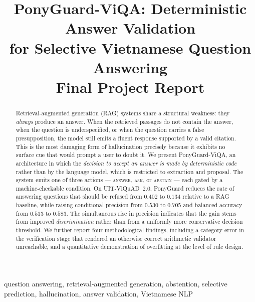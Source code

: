 \documentclass[conference]{IEEEtran}
\newcommand{\ACT}[1]{\textsc{#1}}
\begin{document}
\title{PonyGuard-ViQA: Deterministic Answer Validation\\
for Selective Vietnamese Question Answering\\
\large\textbf{Final Project Report}}

\author{
}

\maketitle

\begin{abstract}
Retrieval-augmented generation (RAG) systems share a structural weakness: they
\emph{always} produce an answer. When the retrieved passages do not contain the
answer, when the question is underspecified, or when the question carries a false
presupposition, the model still emits a fluent response supported by a valid
citation. This is the most damaging form of hallucination precisely because it
exhibits no surface cue that would prompt a user to doubt it. We present
PonyGuard-ViQA, an architecture in which the \emph{decision to accept an answer
is made by deterministic code} rather than by the language model, which is
restricted to extraction and proposal. The system emits one of three actions ---
\ACT{answer}, \ACT{ask}, or \ACT{abstain} --- each gated by a machine-checkable
condition. On UIT-ViQuAD~2.0, PonyGuard reduces the rate of answering questions
that should be refused from $0.402$ to $0.134$ relative to a RAG baseline, while
raising conditional precision from $0.530$ to $0.705$ and balanced accuracy from
$0.513$ to $0.583$. The simultaneous rise in precision indicates that the gain
stems from improved \emph{discrimination} rather than from a uniformly more
conservative decision threshold. We further report four methodological findings,
including a category error in the verification stage that rendered an otherwise
correct arithmetic validator unreachable, and a quantitative demonstration of
overfitting at the level of rule design.
\end{abstract}

\begin{IEEEkeywords}
question answering, retrieval-augmented generation, abstention, selective
prediction, hallucination, answer validation, Vietnamese NLP
\end{IEEEkeywords}
\end{document}
